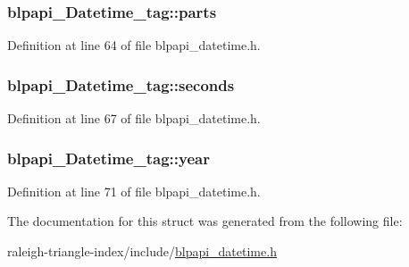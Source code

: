 \subsubsection[{\texorpdfstring{parts}{parts}}]{ blpapi\+\_\+\+Datetime\+\_\+tag\+::parts}\hypertarget{structblpapi___datetime__tag_afc7e10f10f66a3ba2a633ea6e5159f32}{}\label{structblpapi___datetime__tag_afc7e10f10f66a3ba2a633ea6e5159f32}


Definition at line 64 of file blpapi\+\_\+datetime.\+h.

\subsubsection[{\texorpdfstring{seconds}{seconds}}]{ blpapi\+\_\+\+Datetime\+\_\+tag\+::seconds}\hypertarget{structblpapi___datetime__tag_a67495f8ba256bc97aaf5a2ae08bad645}{}\label{structblpapi___datetime__tag_a67495f8ba256bc97aaf5a2ae08bad645}


Definition at line 67 of file blpapi\+\_\+datetime.\+h.

\subsubsection[{\texorpdfstring{year}{year}}]{ blpapi\+\_\+\+Datetime\+\_\+tag\+::year}\hypertarget{structblpapi___datetime__tag_a1860a800fe40ad608105be2ad1b1ec8a}{}\label{structblpapi___datetime__tag_a1860a800fe40ad608105be2ad1b1ec8a}


Definition at line 71 of file blpapi\+\_\+datetime.\+h.



The documentation for this struct was generated from the following file\+:\begin{DoxyCompactItemize}
\item 
raleigh-\/triangle-\/index/include/\hyperlink{blpapi__datetime_8h}{blpapi\+\_\+datetime.\+h}\end{DoxyCompactItemize}
